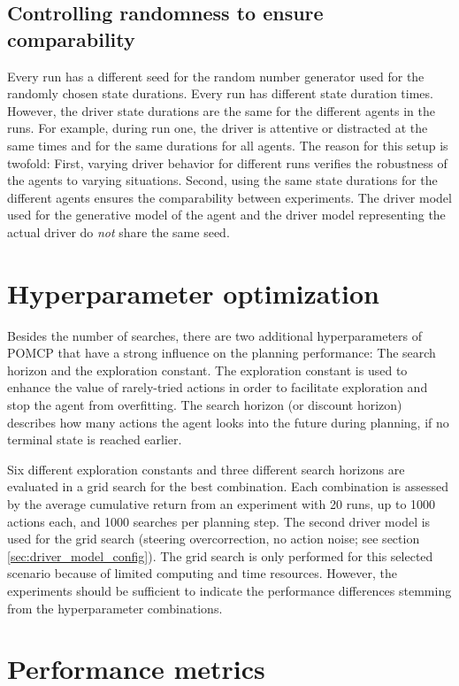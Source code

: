 \subsection{Controlling randomness to ensure comparability}

Every run has a different seed for the random number generator used for the randomly chosen state durations. Every run has different state duration times. However, the driver state durations are the same for the different agents in the runs. For example, during run one, the driver is attentive or distracted at the same times and for the same durations for all agents. The reason for this setup is twofold: First, varying driver behavior for different runs verifies the robustness of the agents to varying situations. Second, using the same state durations for the different agents ensures the comparability between experiments. The driver model used for the generative model of the agent and the driver model representing the actual driver do \emph{not} share the same seed.

\section{Hyperparameter optimization}
\label{sec:exp_hyperparams}

Besides the number of searches, there are two additional hyperparameters of POMCP that have a strong influence on the planning performance: The search horizon and the exploration constant. The exploration constant is used to enhance the value of rarely-tried actions in order to facilitate exploration and stop the agent from overfitting. The search horizon (or discount horizon) describes how many actions the agent looks into the future during planning, if no terminal state is reached earlier.

Six different exploration constants and three different search horizons are evaluated in a grid search for the best combination. Each combination is assessed by the average cumulative return from an experiment with 20 runs, up to 1000 actions each, and 1000 searches per planning step. The second driver model is used for the grid search (steering overcorrection, no action noise; see section \ref{sec:driver_model_config}). The grid search is only performed for this selected scenario because of limited computing and time resources. However, the experiments should be sufficient to indicate the performance differences stemming from the hyperparameter combinations.

\section{Performance metrics}
\label{sec:perf_metrics}

